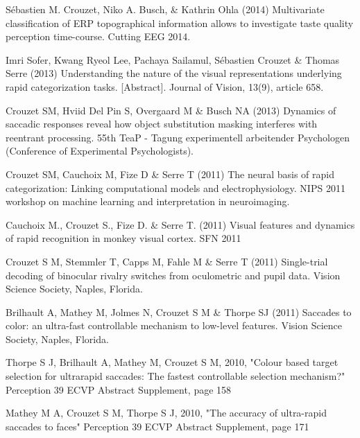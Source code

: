\documentclass[margin,line]{resume}
\begin{document}
\begin{resume}
\vspace{-2mm} Sébastien M. Crouzet, Niko A. Busch, \& Kathrin Ohla (2014) Multivariate classification of ERP topographical information allows to investigate taste quality perception time-course. Cutting EEG 2014.

\vspace{-2mm} Imri Sofer, Kwang Ryeol Lee, Pachaya Sailamul, Sébastien Crouzet \& Thomas Serre (2013) Understanding the nature of the visual representations underlying rapid categorization tasks.  [Abstract]. Journal of Vision, 13(9), article 658.

\vspace{-2mm} Crouzet SM, Hviid Del Pin S, Overgaard M \& Busch NA (2013) Dynamics of saccadic responses reveal how object substitution masking interferes with reentrant processing. 55th TeaP - Tagung experimentell arbeitender Psychologen (Conference of Experimental Psychologists).

\vspace{-2mm} Crouzet SM, Cauchoix M, Fize D \& Serre T (2011) The neural basis of rapid categorization: Linking computational models and electrophysiology. NIPS 2011 workshop on machine learning and interpretation in neuroimaging.

\vspace{-2mm} Cauchoix M., Crouzet S., Fize D. \& Serre T. (2011) Visual features and dynamics of rapid recognition in monkey visual cortex. SFN 2011

\vspace{-2mm} Crouzet S M, Stemmler T, Capps M, Fahle M \& Serre T (2011) Single-trial decoding of binocular rivalry switches from oculometric and pupil data. Vision Science Society, Naples, Florida.

\newpage

\vspace{-2mm} Brilhault A, Mathey M, Jolmes N, Crouzet S M \& Thorpe SJ (2011) Saccades to color: an ultra-fast controllable mechanism to low-level features. Vision Science Society, Naples, Florida.

\vspace{-2mm} Thorpe S J, Brilhault A, Mathey M, Crouzet S M, 2010, "Colour based target selection for ultrarapid saccades: The fastest controllable selection mechanism?" Perception 39 ECVP Abstract Supplement, page 158

\vspace{-2mm} Mathey M A, Crouzet S M, Thorpe S J, 2010, "The accuracy of ultra-rapid saccades to faces" Perception 39 ECVP Abstract Supplement, page 171


\end{resume}
\end{document}
